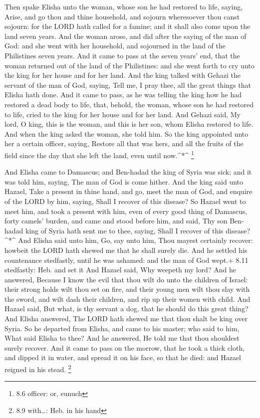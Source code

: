  Then spake Elisha unto the woman, whose son he had restored
to life, saying, Arise, and go thou and thine household, and sojourn
wheresoever thou canst sojourn: for the LORD hath called for a famine;
and it shall also come upon the land seven years.  And the
woman arose, and did after the saying of the man of God: and she went
with her household, and sojourned in the land of the Philistines seven
years.  And it came to pass at the seven years' end, that
the woman returned out of the land of the Philistines: and she went
forth to cry unto the king for her house and for her land. 
And the king talked with Gehazi the servant of the man of God, saying,
Tell me, I pray thee, all the great things that Elisha hath done.
 And it came to pass, as he was telling the king how he had
restored a dead body to life, that, behold, the woman, whose son he had
restored to life, cried to the king for her house and for her land. And
Gehazi said, My lord, O king, this is the woman, and this is her son,
whom Elisha restored to life.  And when the king asked the
woman, she told him. So the king appointed unto her a certain officer,
saying, Restore all that was hers, and all the fruits of the field since
the day that she left the land, even until now.\^{}*\^{} \footnote{8.6
  officer: or, eunuch}

 And Elisha came to Damascus; and Ben-hadad the king of
Syria was sick; and it was told him, saying, The man of God is come
hither.  And the king said unto Hazael, Take a present in
thine hand, and go, meet the man of God, and enquire of the LORD by him,
saying, Shall I recover of this disease?  So Hazael went to
meet him, and took a present with him, even of every good thing of
Damascus, forty camels' burden, and came and stood before him, and said,
Thy son Ben-hadad king of Syria hath sent me to thee, saying, Shall I
recover of this disease?\^{}*\^{}  And Elisha said unto
him, Go, say unto him, Thou mayest certainly recover: howbeit the LORD
hath shewed me that he shall surely die.  And he settled
his countenance stedfastly, until he was ashamed: and the man of God
wept.+ 8.11 stedfastly: Heb. and set it  And Hazael said,
Why weepeth my lord? And he answered, Because I know the evil that thou
wilt do unto the children of Israel: their strong holds wilt thou set on
fire, and their young men wilt thou slay with the sword, and wilt dash
their children, and rip up their women with child.  And
Hazael said, But what, is thy servant a dog, that he should do this
great thing? And Elisha answered, The LORD hath shewed me that thou
shalt be king over Syria.  So he departed from Elisha, and
came to his master; who said to him, What said Elisha to thee? And he
answered, He told me that thou shouldest surely recover. 
And it came to pass on the morrow, that he took a thick cloth, and
dipped it in water, and spread it on his face, so that he died: and
Hazael reigned in his stead. \footnote{8.9 with\ldots: Heb. in his hand}

